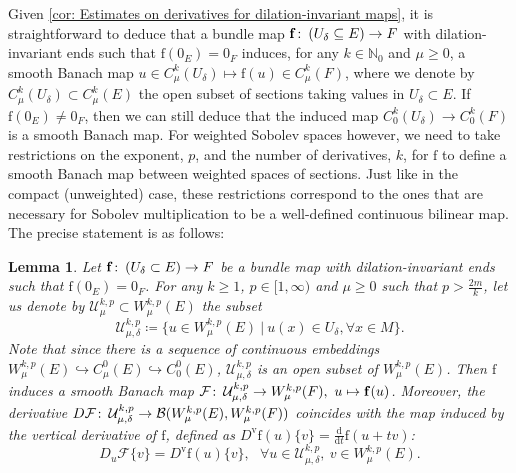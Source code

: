 \documentclass{article}
\numberwithin{equation}{section}        %
\theoremstyle{bfnote}
\newtheorem{lem}[thm]{Lemma}                %
\theoremstyle{definition}
\theoremstyle{bfremark}
\newcommand{\col}{\colon \thinspace}        %
\newcommand{\N}{\mathbb{N}}                 %
\newcommand{\diff}{\mathrm{d}}                      %
\newcommand{\bmap}[1]{\boldsymbol{\mathrm{#1}}}     %
\begin{document}
Given \cref{cor: Estimates on derivatives for dilation-invariant maps}, it is straightforward to deduce that a bundle map $\bmap{f} \col (U_\delta \subseteq E) \to F$ with dilation-invariant ends such that $\bmap{f}(0_E) = 0_F$ induces, for any $k \in \N_0$ and $\mu \geq 0$, a smooth Banach map $u \in C^{k}_\mu(U_\delta) \mapsto \bmap{f}(u) \in C^k_\mu(F)$, where we denote by $C^k_\mu(U_\delta) \subset C^k_\mu(E)$ the open subset of sections taking values in $U_\delta \subset E$. If $\bmap{f}(0_E) \neq 0_F$, then we can still deduce that the induced map $C^k_0(U_\delta) \to C^k_0(F)$ is a smooth Banach map. For weighted Sobolev spaces however, we need to take restrictions on the exponent, $p$, and the number of derivatives, $k$, for $\bmap{f}$ to define a smooth Banach map between weighted spaces of sections. Just like in the compact (unweighted) case, these restrictions correspond to the ones that are necessary for Sobolev multiplication to be a well-defined continuous bilinear map. The precise statement is as follows:


\begin{lem}     \label{lem: Master lemma}
    Let $\bmap{f} \col (U_\delta \subset E) \to F$ be a bundle map with dilation-invariant ends such that $\bmap{f}(0_E) = 0_F$. For any $k \geq 1$, $p \in [1,\infty)$ and $\mu \geq 0$ such that $p > \frac{2m}{k}$, let us denote by $\mathcal{U}^{k,p}_\mu \subset W^{k,p}_\mu(E)$ the subset
    \begin{equation*}
        \mathcal{U}^{k,p}_{\mu,\delta} \coloneqq \{ u \in W^{k,p}_\mu(E) ~ | ~ u(x) \in U_\delta,  \forall x \in M \}.
    \end{equation*}
    Note that since there is a sequence of continuous embeddings $W^{k,p}_\mu(E) \hookrightarrow C^0_\mu(E) \hookrightarrow C^0_0(E)$, $\mathcal{U}^{k,p}_{\mu,\delta}$ is an open subset of $W^{k,p}_{\mu}(E)$. Then $\bmap{f}$ induces a smooth Banach map $\mathcal{F} \col \mathcal{U}^{k,p}_{\mu,\delta} \to W^{k,p}_\mu(F), ~ u \mapsto \bmap{f}(u)$. Moreover, the derivative $D \mathcal{F} \col \mathcal{U}^{k,p}_{\mu,\delta} \to \mathcal{B}(W^{k,p}_\mu(E),W^{k,p}_\mu(F))$ coincides with the map induced by the vertical derivative of $\bmap{f}$, defined as  $D^{\mathrm{v}} \bmap{f}(u) \{v\} = \frac{\diff}{\diff t} \bmap{f}(u+tv)$:
        \begin{equation*}
            D_u \mathcal{F}\{v\} = D^{\mathrm{v}} \bmap{f}(u) \{v\}, ~~~ \forall u \in \mathcal{U}^{k,p}_{\mu,\delta}, ~ v \in W^{k,p}_\mu(E).
        \end{equation*}
\end{lem}
\end{document}
